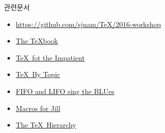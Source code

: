 \documentclass{beamer}
\begin{document}
%
\begin{frame}{관련문서}
  \begin{itemize}
  \item \url{https://github.com/sjnam/TeX/2016-workshop}
  \item \href{http://ftp.ktug.org/tex-archive/systems/knuth/dist/tex/}
    {The \TeX book}
  \item \href{http://ftp.ktug.org/tex-archive/info/impatient/book.pdf}
    {\TeX\ fot the Impatient}
  \item \href{http://ftp.ktug.org/tex-archive/info/texbytopic/TeXbyTopic.pdf}
    {\TeX\ By Topic}
  \item \href{https://www.tug.org/TUGboat/tb14-1/tb38laan.pdf}
    {FIFO and LIFO sing the BLUes}
  \item \href{https://www.tug.org/TUGboat/tb08-3/tb19knut.pdf}
    {Macros for Jill}
  \item \href{https://www.tug.org/TUGboat/tb15-1/tb42arseneau.pdf}
    {The TeX\ Hierarchy}
  \end{itemize}
\end{frame}


%
\end{document}
